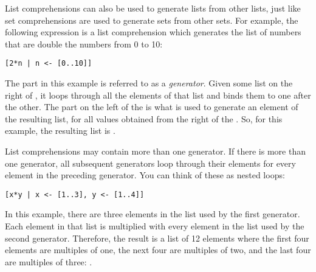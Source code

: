 List comprehensions can also be used to generate lists from other lists, just like set comprehensions are used to generate sets from other sets. For example, the following expression is a list comprehension which generates the list of numbers that are double the numbers from 0 to 10:
\begin{verbatim}
[2*n | n <- [0..10]]
\end{verbatim}
The  part in this example is referred to as a \emph{generator}. Given some list on the right of \haskellIn{<-}, it loops through all the elements of that list and binds them to  one after the other. The part on the left of the \haskellIn{|} is what is used to generate an element of the resulting list, for all values obtained from the right of the \haskellIn{|}. So, for this example, the resulting list is \haskellIn{[0,2,4,6,8,10,12,14,16,18,20]}.

\taskLine


\taskLine


\taskLine

List comprehensions may contain more than one generator. If there is more than one generator, all subsequent generators loop through their elements for every element in the preceding generator. You can think of these as nested loops:
\begin{verbatim}
[x*y | x <- [1..3], y <- [1..4]]
\end{verbatim}
In this example, there are three elements in the list used by the first generator. Each element in that list is multiplied with every element in the list used by the second generator. Therefore, the result is a list of 12 elements where the first four elements are multiples of one, the next four are multiples of two, and the last four are multiples of three: \haskellIn{[1,2,3,4,2,4,6,8,3,6,9,12]}.

\taskLine


